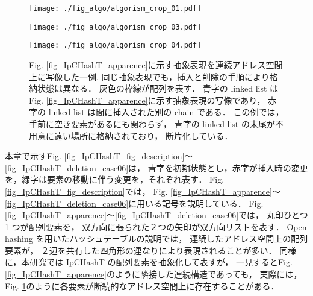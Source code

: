 \begin{figure}
  \texttt{[image: ./fig\_algo/algorism\_crop\_01.pdf]}
  \caption{
    Fig. \ref{fig_IpCHashT_apparence}〜\ref{fig_IpCHashT_deletion_case06}に用いる記号．
    ``Ope.''は，実行順序を表し，``Ope. 0'' の場合は初期状態を意味する．
    下向き矢印は，ハッシュ値の示す配列アドレス上に置かれる．
    各要素は，丸 1 つと prev locator 1 つ，next locator 1 つで構成されるが，
    接続が無い場合 locator は省略される．
    点線で書かれた丸は空の要素を表し，緑の枠線と矢印は要素の移動を表す．
    バツ印は linked list の削除表す．
    配色は，青色を初期状態，赤色を要素の挿入・削除動作，緑色を要素の移動，と分かれている．
  }
  \label{fig_IpCHashT_fig_description}

  \texttt{[image: ./fig\_algo/algorism\_crop\_03.pdf]}
  \caption{
    IpCHashT に挿入された要素の抽象表現.
    この場合，3 つの要素のハッシュ値は，いずれも first 要素のアドレスを示すため，
    linked list により衝突を解決している．
    各要素は prev locator と next locator の示す相対位置により接続されており，
    各要素間に別の要素がある可能性がある．
  }
  \label{fig_IpCHashT_apparence}

  \texttt{[image: ./fig\_algo/algorism\_crop\_04.pdf]}
  \caption{
    Fig. \ref{fig_IpCHashT_apparence}に示す抽象表現を連続アドレス空間上に写像した一例.
    同じ抽象表現でも，挿入と削除の手順により格納状態は異なる．
    灰色の枠線が配列を表す．
    青字の linked list はFig. \ref{fig_IpCHashT_apparence}に示す抽象表現の写像であり，
    赤字の linked list は間に挿入された別の chain である．
    この例では，手前に空き要素があるにも関わらず，
    青字の linked list の末尾が不用意に遠い場所に格納されており，
    断片化している．
  }
  \label{fig_IpCHashT_insert_introspection}
\end{figure}

本章で示すFig. \ref{fig_IpCHashT_fig_description}〜\ref{fig_IpCHashT_deletion_case06}は，
青字を初期状態とし，赤字が挿入時の変更を，緑字は要素の移動に伴う変更を，それぞれ表す．
Fig. \ref{fig_IpCHashT_fig_description}では，
Fig. \ref{fig_IpCHashT_apparence}〜\ref{fig_IpCHashT_deletion_case06}に用いる記号を説明している．
Fig. \ref{fig_IpCHashT_apparence}〜\ref{fig_IpCHashT_deletion_case06}では，
丸印ひとつ 1 つが配列要素を，
双方向に張られた２つの矢印が双方向リストを表す．
Open hashing を用いたハッシュテーブルの説明では，
連続したアドレス空間上の配列要素が，
２辺を共有した四角形の連なりにより表現されることが多い．
同様に，本研究では IpCHashT の配列要素を抽象化して表すが，
一見するとFig. \ref{fig_IpCHashT_apparence}のように隣接した連続構造であっても，
実際には，Fig. \ref{fig_IpCHashT_insert_introspection}のように各要素が断続的なアドレス空間上に存在することがある．

